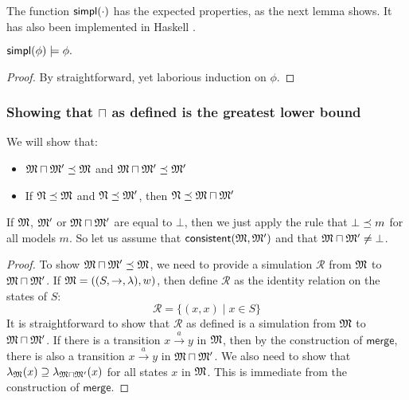 \NI The function $\mathsf{simpl}(\cdot)$ has the expected properties, as the next
lemma shows.  It has also been implemented in Haskell
\cite{HaskellImplementation}.

\begin{lemma}
$\mathsf{simpl}(\phi) \models \phi.$
\end{lemma}
\begin{proof}
By straightforward, yet laborious induction on $\phi$.
\end{proof}

\subsubsection{Showing that $\sqcap$ as defined is the greatest lower bound}
We will show that:
\begin{itemize}
\item
$\frak{M} \sqcap \frak{M}' \preceq \frak{M}$ and $\frak{M} \sqcap \frak{M}' \preceq \frak{M}'$
\item
If $\frak{N} \preceq \frak{M}$ and $\frak{N} \preceq \frak{M}'$, then $\frak{N} \preceq \frak{M} \sqcap \frak{M}'$
\end{itemize}
If $\frak{M}$, $ \frak{M}'$ or $\frak{M} \sqcap \frak{M}'$ are equal to $\bot$, then we just apply the rule that $\bot \preceq m$ for all models $m$. 
So let us assume that $\mathsf{consistent}(\frak{M}, \frak{M}')$ and that $\frak{M} \sqcap \frak{M}'  \neq \bot$.

\begin{proof}
To show $\frak{M} \sqcap \frak{M}' \preceq \frak{M}$, we need to provide a simulation $\mathcal{R}$ from $\frak{M}$ to  $\frak{M} \sqcap \frak{M}'$.
If $\frak{M} = ((S,\rightarrow,\lambda),w)$, then define $\mathcal{R}$ as the identity relation on the states of $S$:
\[
\mathcal{R} = \{(x,x) \; | \; x \in S\}
\]
It is straightforward to show that $\mathcal{R}$ as defined is a simulation from $\frak{M}$ to  $\frak{M} \sqcap \frak{M}'$.
If there is a transition $x \xrightarrow{a} y$ in $\frak{M}$, then by the construction of $\mathsf{merge}$, there is also a transition $x \xrightarrow{a} y$ in $\frak{M} \sqcap \frak{M}'$.
We also need to show that $\lambda_{\frak{M}}(x) \supseteq \lambda_{\frak{M} \sqcap \frak{M}'}(x)$ for all states $x$ in $\frak{M}$. This is immediate from the construction of $\mathsf{merge}$.

\end{proof}

